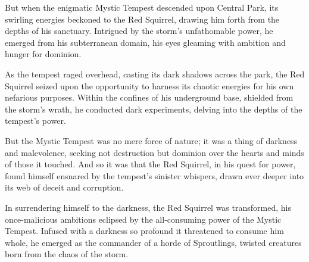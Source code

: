 But when the enigmatic Mystic Tempest descended upon Central Park, its swirling energies beckoned to the Red Squirrel, drawing him forth from the depths of his sanctuary. Intrigued by the storm's unfathomable power, he emerged from his subterranean domain, his eyes gleaming with ambition and hunger for dominion.

As the tempest raged overhead, casting its dark shadows across the park, the Red Squirrel seized upon the opportunity to harness its chaotic energies for his own nefarious purposes. Within the confines of his underground base, shielded from the storm's wrath, he conducted dark experiments, delving into the depths of the tempest's power.

But the Mystic Tempest was no mere force of nature; it was a thing of darkness and malevolence, seeking not destruction but dominion over the hearts and minds of those it touched. And so it was that the Red Squirrel, in his quest for power, found himself ensnared by the tempest's sinister whispers, drawn ever deeper into its web of deceit and corruption.

In surrendering himself to the darkness, the Red Squirrel was transformed, his once-malicious ambitions eclipsed by the all-consuming power of the Mystic Tempest. Infused with a darkness so profound it threatened to consume him whole, he emerged as the commander of a horde of Sproutlings, twisted creatures born from the chaos of the storm.

